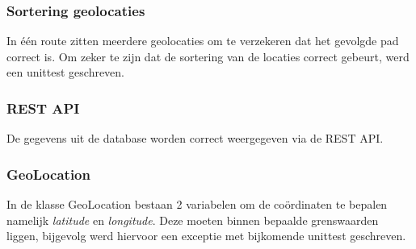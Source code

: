 \documentclass[ps,a4paper,oneside]{report}
\begin{document}
\subsubsection{Sortering geolocaties}
In \'e\'en route zitten meerdere geolocaties om te verzekeren dat het gevolgde pad correct is. Om zeker te zijn dat de sortering van de locaties correct gebeurt, werd een unittest geschreven.
\subsubsection{REST API}
De gegevens uit de database worden correct weergegeven via de REST API.
\subsubsection{GeoLocation}
In de klasse GeoLocation bestaan 2 variabelen om de co\"ordinaten te bepalen namelijk \textit{latitude} en \textit{longitude}. Deze moeten binnen bepaalde grenswaarden liggen, bijgevolg werd hiervoor een exceptie met bijkomende unittest geschreven.
\end{document}
